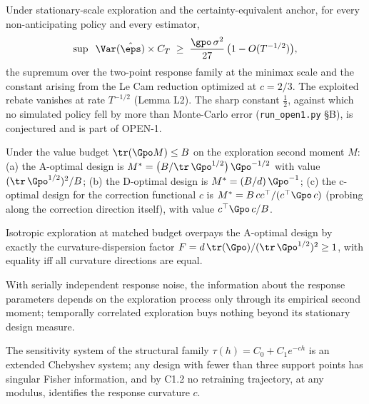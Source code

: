 \documentclass[11pt]{article}
\begin{document}
\begin{theorem}
Under stationary-scale exploration and the certainty-equivalent anchor,
for every non-anticipating policy and every estimator,
\[
\sup\;\;\Var(\hat\eps)\times C_T \;\ge\; \frac{\gpo\,\sigma^2}{27}\,
\big(1 - O(T^{-1/2})\big),
\]
the supremum over the two-point response family at the minimax scale and
the constant arising from the Le Cam reduction optimized at $c = 2/3$.
The exploited rebate vanishes at rate $T^{-1/2}$ (Lemma L2). The sharp
constant $\tfrac{1}{2}$, against which no simulated policy fell by more
than Monte-Carlo error (\texttt{run\_open1.py} \S B), is conjectured and
is part of OPEN-1.
\end{theorem}

\begin{theorem}
Under the value budget $\tr(\Gpo M) \le B$ on the exploration second
moment $M$:
(a) the A-optimal design is $M^{*} = \big(B/\tr\,\Gpo^{1/2}\big)\,
\Gpo^{-1/2}$ with value $(\tr\,\Gpo^{1/2})^2/B$;
(b) the D-optimal design is $M^{*} = (B/d)\,\Gpo^{-1}$;
(c) the c-optimal design for the correction functional $c$ is
$M^{*} = B\,cc^\top/(c^\top \Gpo\, c)$ (probing along the correction
direction itself), with value $c^\top \Gpo\, c / B$.
\end{theorem}

\begin{corollary}
Isotropic exploration at matched budget overpays the A-optimal design by
exactly the curvature-dispersion factor
$F = d\,\tr(\Gpo)/(\tr\,\Gpo^{1/2})^2 \ge 1$, with equality iff all
curvature directions are equal.
\end{corollary}

\begin{lemma}
With serially independent response noise, the information about the
response parameters depends on the exploration process only through its
empirical second moment; temporally correlated exploration buys nothing
beyond its stationary design measure.
\end{lemma}

\begin{theorem}
The sensitivity system of the structural family
$\tau(h) = C_0 + C_1 e^{-ch}$ is an extended Chebyshev system; any design
with fewer than three support points has singular Fisher information, and
by C1.2 no retraining trajectory, at any modulus, identifies the response
curvature $c$.
\end{theorem}
\end{document}
